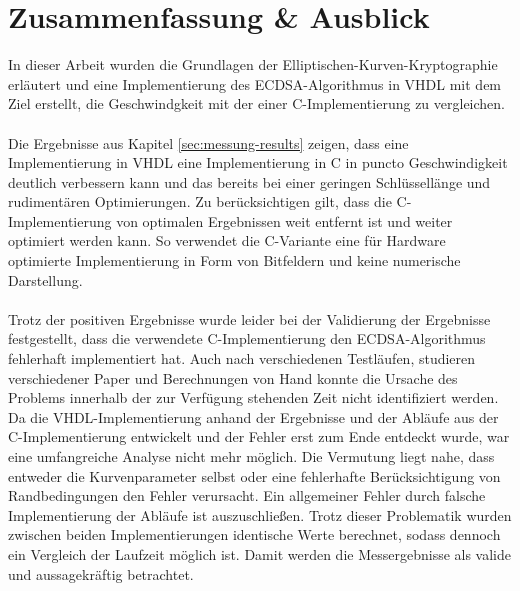 \chapter{Zusammenfassung \& Ausblick} 
\label{sec:fazit}
In dieser Arbeit wurden die Grundlagen der Elliptischen-Kurven-Kryptographie erläutert und eine Implementierung des ECDSA-Algorithmus in VHDL mit dem Ziel erstellt, die Geschwindgkeit mit der einer C-Implementierung zu vergleichen.
\\ \\
Die Ergebnisse aus Kapitel \ref{sec:messung-results} zeigen, dass eine Implementierung in VHDL eine Implementierung in C in puncto Geschwindigkeit deutlich verbessern kann und das bereits bei einer geringen Schlüssellänge und rudimentären Optimierungen. Zu berücksichtigen gilt, dass die C-Implementierung von optimalen Ergebnissen weit entfernt ist und weiter optimiert werden kann. So verwendet die C-Variante eine für Hardware optimierte Implementierung in Form von Bitfeldern und keine numerische Darstellung.
\\ \\
Trotz der positiven Ergebnisse wurde leider bei der Validierung der Ergebnisse festgestellt, dass die verwendete C-Implementierung den ECDSA-Algorithmus fehlerhaft implementiert hat. Auch nach verschiedenen Testläufen, studieren verschiedener Paper und Berechnungen von Hand konnte die Ursache des Problems innerhalb der zur Verfügung stehenden Zeit nicht identifiziert werden. Da die VHDL-Implementierung anhand der Ergebnisse und der Abläufe aus der C-Implementierung entwickelt und der Fehler erst zum Ende entdeckt wurde, war eine umfangreiche Analyse nicht mehr möglich. Die Vermutung liegt nahe, dass entweder die Kurvenparameter selbst oder eine fehlerhafte Berücksichtigung von Randbedingungen den Fehler verursacht. Ein allgemeiner Fehler durch falsche Implementierung der Abläufe ist auszuschließen. Trotz dieser Problematik wurden zwischen beiden Implementierungen identische Werte berechnet, sodass dennoch ein Vergleich der Laufzeit möglich ist. Damit werden die Messergebnisse als valide und aussagekräftig betrachtet.


